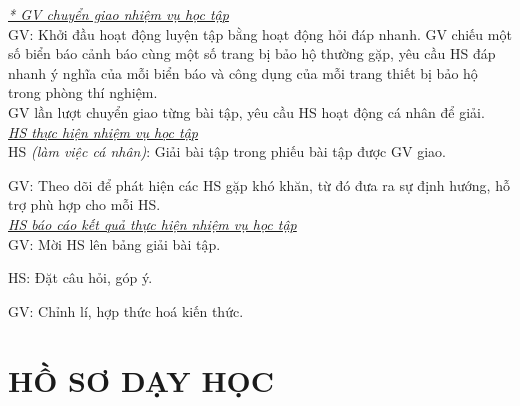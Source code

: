 {\textit{\underline{* GV chuyển giao nhiệm vụ học tập}}\\
	GV: Khởi đầu hoạt động luyện tập bằng hoạt động hỏi đáp nhanh. GV chiếu một số biển báo cảnh báo cùng một số trang bị bảo hộ thường gặp, yêu cầu HS đáp nhanh ý nghĩa của mỗi biển báo và công dụng của mỗi trang thiết bị bảo hộ trong phòng thí nghiệm.\\
	GV lần lượt chuyển giao từng bài tập, yêu cầu HS hoạt động cá nhân để giải.\\
	\textit{\underline{HS thực hiện nhiệm vụ học tập}}\\
	HS \textit{(làm việc cá nhân)}:  Giải bài tập trong phiếu bài tập được GV giao. 
	
	GV: Theo dõi để phát hiện các HS gặp khó khăn, từ đó đưa ra sự định hướng, hỗ trợ phù hợp cho mỗi HS.\\
	\textit{\underline{HS báo cáo kết quả thực hiện nhiệm vụ học tập}}\\
	GV: Mời HS lên bảng giải bài tập.
	
	HS: Đặt câu hỏi, góp ý.
	
	GV: Chỉnh lí, hợp thức hoá kiến thức.

}
\section{HỒ SƠ DẠY HỌC}
